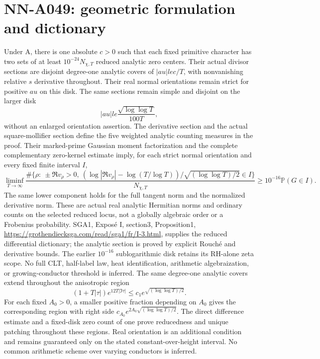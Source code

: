 \section{NN-A049: geometric formulation and dictionary}
\begin{geometricstatement}[NN-A049]
Under A, there is one absolute $c>0$ such that each fixed primitive character has two sets of at least $10^{-24}N_{\chi,T}$ reduced analytic zero centers. Their actual divisor sections are disjoint degree-one analytic covers of $|	au|le c/T$, with nonvanishing relative $s$ derivative throughout. Their real normal orientations remain strict for positive $	au$ on this disk. The same sections remain simple and disjoint on the larger disk
\[
 |	au|le \frac{\sqrt{\log\log T}}{100T},
\]
without an enlarged orientation assertion. The derivative section and the actual square-mollifier section define the five weighted analytic counting measures in the proof. Their marked-prime Gaussian moment factorization and the complete complementary zero-kernel estimate imply, for each strict normal orientation and every fixed finite interval $I$,
\[
 \liminf_{T\to\infty}\frac{\#\{\rho:\ \pm\Re v_\rho>0,\ 
 (\log|\Re v_\rho|-\log(T/\log T))/\sqrt{(\log\log T)/2}\in I\}}
 {N_{\chi,T}}\ge10^{-16}\mathbb P(G\in I).
\]
The same lower component holds for the full tangent norm and the normalized derivative norm. These are actual real analytic Hermitian norms and ordinary counts on the selected reduced locus, not a globally algebraic order or a Frobenius probability. SGA1, Expos\'e I, section3, Proposition1, \url{https://grothendiecksga.com/read/sga1/fr/I-3.html}, supplies the reduced differential dictionary; the analytic section is proved by explicit Rouch\'e and derivative bounds. The earlier $10^{-16}$ sublogarithmic disk retains its RH-alone zeta scope. No full CLT, half-label law, heat identification, arithmetic algebraization, or growing-conductor threshold is inferred.
The same degree-one analytic covers extend throughout the anisotropic region
\[
 (1+T|\tau|)e^{12T|\Im\tau|}\le c_1e^{\sqrt{(\log\log T)/2}}.
\]
For each fixed $A_0>0$, a smaller positive fraction depending on $A_0$ gives the corresponding region with right side $c_{A_0}e^{2A_0\sqrt{(\log\log T)/2}}$. The direct difference estimate and a fixed-disk zero count of one prove reducedness and unique patching throughout these regions. Real orientation is an additional condition and remains guaranteed only on the stated constant-over-height interval. No common arithmetic scheme over varying conductors is inferred.


\end{geometricstatement}
